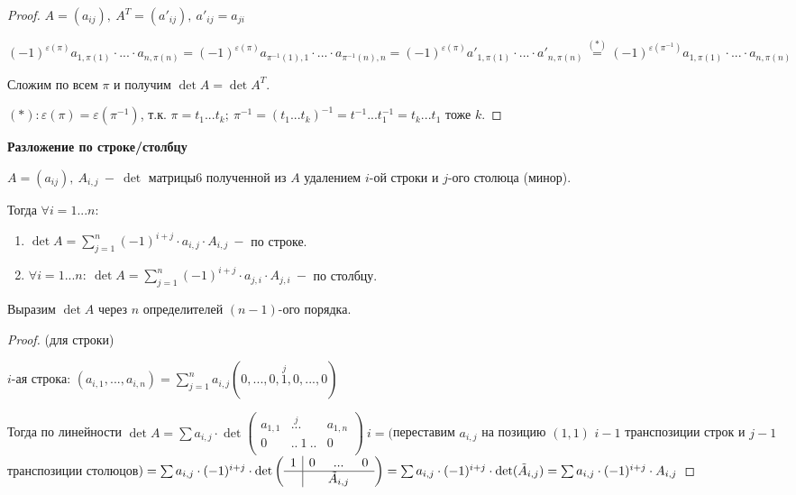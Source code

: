\begin{proof}
    $A=(a_{ij}),\ A^T=(a'_{ij}),\ a'_{ij}=a_{ji}$

    $(-1)^{\varepsilon(\pi)}a_{1,\pi(1)}\cdot ...\cdot a_{n,\pi(n)}=(-1)^{\varepsilon(\pi)}a_{\pi^{-1}(1),1}\cdot ...\cdot a_{\pi^{-1}(n),n}=(-1)^{\varepsilon(\pi)}a'_{1,\pi(1)}\cdot ...\cdot a'_{n,\pi(n)}\overset{(*)}{=}(-1)^{\varepsilon(\pi^{-1})}a_{1,\pi(1)}\cdot ...\cdot a_{n,\pi(n)}$

    Сложим по всем $\pi$ и получим $\det A=\det A^T$.

    $(*):\varepsilon(\pi)=\varepsilon(\pi^{-1})$, т.к. $\pi=t_1...t_k;\ \pi^{-1}=(t_1...t_k)^{-1}=t^{-1}...t^{-1}_1=t_k...t_1$ тоже $k$.
\end{proof}

\begin{theorem}
    \textbf{Разложение по строке/столбцу}

    $A=(a_{ij}),\ A_{i,j}\ -\ \det$ матрицы6 полученной из $A$ удалением $i$-ой строки и $j$-ого столюца (минор).

    Тогда $\forall i=1...n:$

    \begin{enumerate}
        \item $\det A=\sum\limits_{j=1}^n(-1)^{i+j}\cdot a_{i,j}\cdot A_{i,j}\ -$ по строке.
        \item $ \forall i=1...n:\ \det A=\sum\limits_{j=1}^n(-1)^{i+j}\cdot a_{j,i}\cdot A_{j,i}\ -$ по столбцу.
    \end{enumerate}

    Выразим $\det A$ через $n$ определителей $(n-1)$-ого порядка.
\end{theorem}

\begin{proof}
(для строки)

    $i$-ая строка: $(a_{i,1},...,a_{i,n})=\sum\limits_{j=1}^n a_{i,j}(0,...,0,\overset{j}{1},0,...,0)$

    Тогда по линейности $\det A=\sum a_{i,j}\cdot \det \begin{pmatrix}
                                                           a_{1,1} & \overset{j}{...} & a_{1,n} \\ 0 & ..\ 1\ .. & 0 \\
    \end{pmatrix}\ i=($переставим $a_{i,j}$ на позицию $(1,1)$ $i-1$ транспозиции строк и $j-1$ транспозиции столюцов$)=\sum a_{i,j}\cdot  (-1)^{i+j}\cdot \det \left(
    \begin{array}{c|ccc}
        1 & 0 & ... & 0\\
        \hline
        & & \Tilde{A}_{i,j}
    \end{array}
    \right)=\sum a_{i,j}\cdot  (-1)^{i+j}\cdot \det (\Tilde{A}_{i,j})=\sum a_{i,j}\cdot  (-1)^{i+j}\cdot A_{i,j}$
\end{proof}

